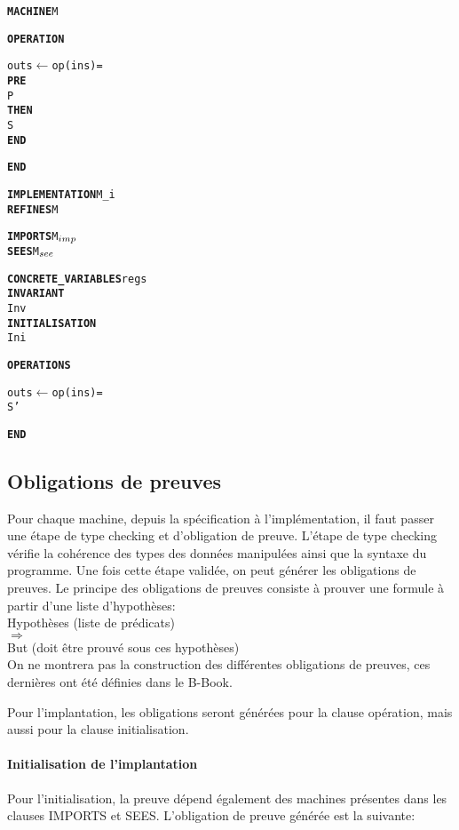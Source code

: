 \setlength{\columnseprule}{0.05cm}
\begin{multicols}{2}
\begin{alltt}
\textbf{MACHINE} M

\textbf{OPERATION}

outs \(\leftarrow\) op(ins) =
  \textbf{PRE}
    P
  \textbf{THEN}
    S
  \textbf{END}

\textbf{END}
\end{alltt}
\columnbreak
\begin{alltt}
\textbf{IMPLEMENTATION} M\_i
\textbf{REFINES} M

\textbf{IMPORTS} M\(\sb{imp}\)
\textbf{SEES} M\(\sb{see}\)

\textbf{CONCRETE\_VARIABLES} regs
\textbf{INVARIANT}
  Inv
\textbf{INITIALISATION}
  Ini

\textbf{OPERATIONS}
  
outs \(\leftarrow\) op(ins) =
  S'

\textbf{END}
\end{alltt}
\end{multicols}



\subsection{Obligations de preuves}

Pour chaque machine, depuis la spécification à l'implémentation, il faut
passer une étape de type checking et d'obligation de preuve. L'étape de type
checking vérifie la cohérence des types des données manipulées ainsi que la
syntaxe du programme. Une fois cette étape validée, on peut générer les
obligations de preuves. Le principe des obligations de preuves consiste à
prouver une formule à partir d'une liste d'hypothèses:\\
Hypothèses (liste de prédicats)\\
$\Rightarrow$\\
But (doit être prouvé sous ces hypothèses)\\
On ne montrera pas la construction des différentes obligations de
preuves, ces dernières ont été définies dans le B-Book. 

\noindent
Pour l'implantation, les obligations seront générées pour la clause opération,
mais aussi pour la clause initialisation. 

\paragraph{Initialisation de l'implantation} Pour l'initialisation, la preuve
dépend également des machines présentes dans les clauses IMPORTS et
SEES. L'obligation de preuve générée est la suivante:\\

